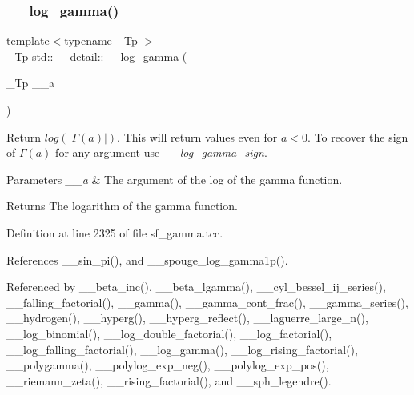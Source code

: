 \subsubsection{\texorpdfstring{\+\_\+\+\_\+log\+\_\+gamma()}{\_\_log\_gamma()}\hspace{0.1cm}{\footnotesize\ttfamily [1/2]}}
{\footnotesize\ttfamily template$<$typename \+\_\+\+Tp $>$ \\
\+\_\+\+Tp std\+::\+\_\+\+\_\+detail\+::\+\_\+\+\_\+log\+\_\+gamma (\begin{DoxyParamCaption}\item[{\+\_\+\+Tp}]{\+\_\+\+\_\+a }\end{DoxyParamCaption})}



Return $ log(|\Gamma(a)|) $. This will return values even for $ a < 0 $. To recover the sign of $ \Gamma(a) $ for any argument use {\itshape \+\_\+\+\_\+log\+\_\+gamma\+\_\+sign}. 


\begin{DoxyParams}{Parameters}
{\em \+\_\+\+\_\+a} & The argument of the log of the gamma function. \\
\hline
\end{DoxyParams}
\begin{DoxyReturn}{Returns}
The logarithm of the gamma function. 
\end{DoxyReturn}


Definition at line 2325 of file sf\+\_\+gamma.\+tcc.



References \+\_\+\+\_\+sin\+\_\+pi(), and \+\_\+\+\_\+spouge\+\_\+log\+\_\+gamma1p().



Referenced by \+\_\+\+\_\+beta\+\_\+inc(), \+\_\+\+\_\+beta\+\_\+lgamma(), \+\_\+\+\_\+cyl\+\_\+bessel\+\_\+ij\+\_\+series(), \+\_\+\+\_\+falling\+\_\+factorial(), \+\_\+\+\_\+gamma(), \+\_\+\+\_\+gamma\+\_\+cont\+\_\+frac(), \+\_\+\+\_\+gamma\+\_\+series(), \+\_\+\+\_\+hydrogen(), \+\_\+\+\_\+hyperg(), \+\_\+\+\_\+hyperg\+\_\+reflect(), \+\_\+\+\_\+laguerre\+\_\+large\+\_\+n(), \+\_\+\+\_\+log\+\_\+binomial(), \+\_\+\+\_\+log\+\_\+double\+\_\+factorial(), \+\_\+\+\_\+log\+\_\+factorial(), \+\_\+\+\_\+log\+\_\+falling\+\_\+factorial(), \+\_\+\+\_\+log\+\_\+gamma(), \+\_\+\+\_\+log\+\_\+rising\+\_\+factorial(), \+\_\+\+\_\+polygamma(), \+\_\+\+\_\+polylog\+\_\+exp\+\_\+neg(), \+\_\+\+\_\+polylog\+\_\+exp\+\_\+pos(), \+\_\+\+\_\+riemann\+\_\+zeta(), \+\_\+\+\_\+rising\+\_\+factorial(), and \+\_\+\+\_\+sph\+\_\+legendre().

